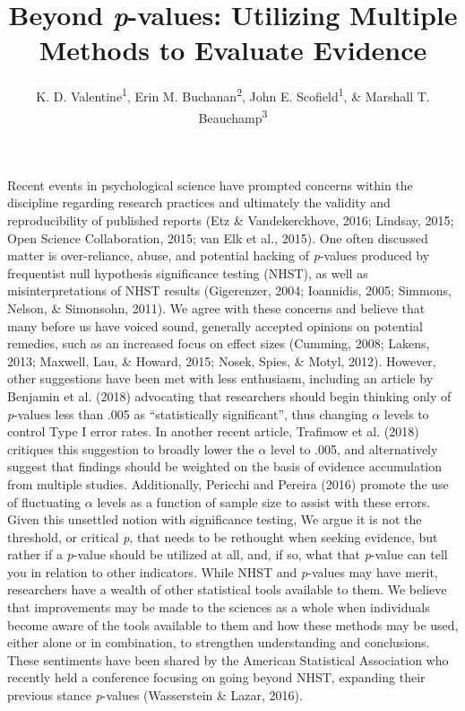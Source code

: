 \documentclass[,man, mask]{apa6}
\title{Beyond \emph{p}-values: Utilizing Multiple Methods to Evaluate Evidence}
\author{K. D. Valentine\textsuperscript{1}, Erin M. Buchanan\textsuperscript{2},
John E. Scofield\textsuperscript{1}, \& Marshall T.
Beauchamp\textsuperscript{3}}
\date{}
\affiliation{
\vspace{0.5cm}
\textsuperscript{1} University of Missouri\\\textsuperscript{2} Missouri State University\\\textsuperscript{3} University of Missouri - Kansas City}
\theoremstyle{definition}
\theoremstyle{definition}
\theoremstyle{definition}
\theoremstyle{remark}
\begin{document}
\maketitle

Recent events in psychological science have prompted concerns within the
discipline regarding research practices and ultimately the validity and
reproducibility of published reports (Etz \& Vandekerckhove, 2016;
Lindsay, 2015; Open Science Collaboration, 2015; van Elk et al., 2015).
One often discussed matter is over-reliance, abuse, and potential
hacking of \emph{p}-values produced by frequentist null hypothesis
significance testing (NHST), as well as misinterpretations of NHST
results (Gigerenzer, 2004; Ioannidis, 2005; Simmons, Nelson, \&
Simonsohn, 2011). We agree with these concerns and believe that many
before us have voiced sound, generally accepted opinions on potential
remedies, such as an increased focus on effect sizes (Cumming, 2008;
Lakens, 2013; Maxwell, Lau, \& Howard, 2015; Nosek, Spies, \& Motyl,
2012). However, other suggestions have been met with less enthusiasm,
including an article by Benjamin et al. (2018) advocating that
researchers should begin thinking only of \emph{p}-values less than .005
as \enquote{statistically significant}, thus changing \(\alpha\) levels
to control Type I error rates. In another recent article, Trafimow et
al. (2018) critiques this suggestion to broadly lower the \(\alpha\)
level to .005, and alternatively suggest that findings should be
weighted on the basis of evidence accumulation from multiple studies.
Additionally, Pericchi and Pereira (2016) promote the use of fluctuating
\(\alpha\) levels as a function of sample size to assist with these
errors. Given this unsettled notion with significance testing, We argue
it is not the threshold, or critical \emph{p}, that needs to be
rethought when seeking evidence, but rather if a \emph{p}-value should
be utilized at all, and, if so, what that \emph{p}-value can tell you in
relation to other indicators. While NHST and \emph{p}-values may have
merit, researchers have a wealth of other statistical tools available to
them. We believe that improvements may be made to the sciences as a
whole when individuals become aware of the tools available to them and
how these methods may be used, either alone or in combination, to
strengthen understanding and conclusions. These sentiments have been
shared by the American Statistical Association who recently held a
conference focusing on going beyond NHST, expanding their previous
stance \emph{p}-values (Wasserstein \& Lazar, 2016).
\end{document}
